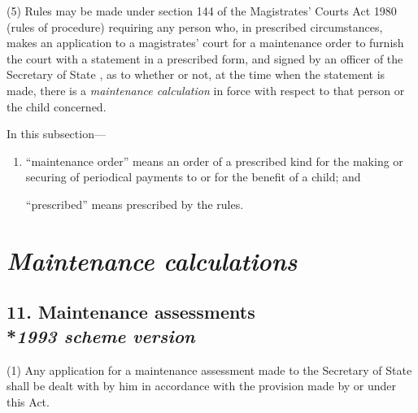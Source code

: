 \documentclass[12pt,a4paper]{article}
\begin{document}
(5) Rules may be made under section 144 of the Magistrates' Courts Act 1980 (rules of procedure) requiring any person who, in prescribed circumstances, makes an application to a magistrates' court for a maintenance order to furnish the court with a statement in a prescribed form, and signed by 
an officer of the 
Secretary of State%
, as to whether or not, at the time when the statement is made, there is a 
\emph{maintenance calculation}  %
in force with respect to that person or the child concerned.

In this subsection—
\begin{enumerate}\item[]
    “maintenance order” means an order of a prescribed kind for the making or securing of periodical payments to or for the benefit of a child; and

    “prescribed” means prescribed by the rules. 
\end{enumerate}


\section{\itshape 
\emph{Maintenance calculations}  %
}

\subsection[11. Maintenance assessments --- \emph{1993 scheme version}]{11. Maintenance assessments\\*\emph{1993 scheme version}}

(1) Any application for a maintenance assessment made to the Secretary of State shall be 
dealt with by him  %
in accordance with the provision made by or under this Act.
\end{document}

